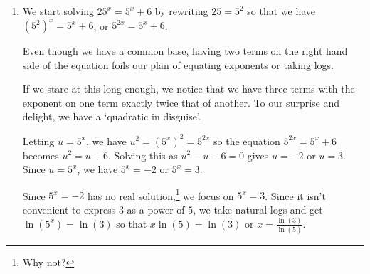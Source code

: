 \documentclass{ximera}
\begin{document}
\begin{example}
\begin{explanation}
\begin{enumerate}
To that end, we clear denominators and get $75\left(1 + 3e^{-2t}\right) = 100$, or $75 + 225e^{-2t} =100$.   We get  $225e^{-2t} = 25$, so finally, $e^{-2t} = \frac{1}{9}$.    



Taking the natural log of both sides gives $\ln\left(e^{-2t}\right) = \ln\left( \frac{1}{9} \right)$.  Since natural log is log base $e$, $\ln\left(e^{-2t}\right) = -2t$.  Likewise, we use the Power Rule to rewrite $\ln\left( \frac{1}{9} \right) = -\ln(9)$.  



Putting these two steps together, we simplify $\ln\left(e^{-2t}\right) = \ln\left( \frac{1}{9} \right)$ to   $-2t = -\ln(9)$.  We arrive at our solution, $t = \frac{\ln(9)}{2}$ which simplifies to $t = \ln(3)$. (Can you explain why?)  



 To check, we see the graphs of  $f(x) = 75$ and $g(x) = \frac{100}{1 + 3e^{-2x}}$, intersect at $x \approx 1.099 \approx \ln(3)$.  As usual, our graph below is courtesy of desmos.

\begin{center}
\end{center}

\item  We start solving $25^{x} = 5^{x} + 6$ by rewriting $25 = 5^2$ so that we have $\left(5^2\right)^{x} = 5^{x} + 6$, or $5^{2x} = 5^{x} + 6$.  



Even though we have a common base, having two terms on the right hand side of the equation foils our plan of equating exponents or taking logs.  



If we stare at this long enough, we notice that we have three terms with the exponent on one term exactly twice that of another. To our surprise and delight, we have a  `quadratic in disguise'.  

Letting $u = 5^{x}$,  we have $u^2 = \left(5^{x}\right)^2 = 5^{2x}$ so the equation $5^{2x} = 5^{x} + 6$ becomes $u^2 = u + 6$.  Solving this as $u^2 - u - 6=0$ gives $u = -2$ or $u = 3$.  Since $u = 5^{x}$, we have $5^{x} = -2$ or $5^{x} = 3$.  



Since $5^{x} = -2$ has no real solution,\footnote{Why not?} we focus on $5^{x} = 3$.  Since it isn't convenient to express $3$ as a power of $5$, we take natural logs and get $\ln\left(5^{x}\right) = \ln(3)$ so that $x \ln(5) = \ln(3)$ or $x = \frac{\ln(3)}{\ln(5)}$.  




\end{enumerate}
\end{explanation}
\end{example}
\end{document}
